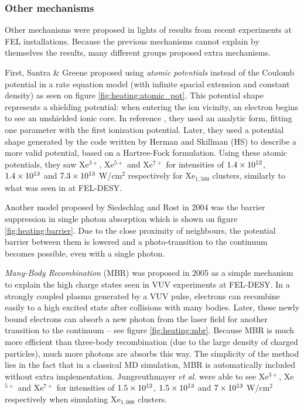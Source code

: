 \subsubsection{Other mechanisms}
Other mechanisms were proposed in lights of results from recent experiments at
FEL installations\cite{Wabnitz2002}. Because the previous mechanisms cannot
explain by themselves
the results, many different groups proposed extra mechanisms.


First, Santra \& Greene proposed using \textit{atomic potentials} instead of
the Coulomb potential in a rate equation model (with infinite spacial
extension and
constant density) as seen on figure \ref{fig:heating:atomic_pot}.
This potential shape represents a shielding potential: when
entering the ion vicinity, an electron begins to see an unshielded ionic core.
In reference \cite{Greene2003}, they used an analytic form, fitting one
parameter
with the first ionization potential. Later\cite{Walters2006}, they used a
potential shape generated by the code written by Herman and
Skillman\cite{HS1963} (HS) to describe a more valid potential, based on a
Hartree-Fock formulation. Using these atomic potentials, they saw Xe$^{3+}$,
Xe$^{5+}$ and Xe$^{7+}$ for intensities of $\ten{1.4}{12}$, $\ten{1.4}{13}$ and
$\ten{7.3}{13}$ W/cm$^2$ respectively for Xe$_{1,500}$ clusters, similarly to
what was seen in at FEL-DESY.

Another model proposed by Siedschlag and Rost\cite{Siedschlag2004} in 2004 was
the barrier suppression in single photon absorption which is shown on figure
\ref{fig:heating:barrier}. Due to the close proximity
of neighbours, the potential barrier between them is lowered and
a photo-transition to the continuum becomes possible, even with a single photon.

\textit{Many-Body Recombination} (MBR) was proposed in 2005
as a simple mechanism to explain the high charge states seen in VUV
experiments at FEL-DESY\cite{Jungreuthmayer2005}. In a strongly coupled plasma
generated by a VUV pulse, electrons can recombine easily to a high excited
state after collisions with many bodies. Later, these newly bound electrons can
absorb a new photon from the laser field for another transition to the
continuum -- see figure \ref{fig:heating:mbr}.
Because MBR is much more efficient than three-body
recombination (due to the large density of charged particles), much more
photons are absorbs this way. The simplicity of the
method lies in the fact that in a classical MD simulation, MBR is automatically
included without extra implementation. Jungreuthmayer \textit{et al.} were able
to see Xe$^{3+}$, Xe$^{5+}$ and Xe$^{7+}$ for intensities of $\ten{1.5}{12}$,
$\ten{1.5}{13}$ and $\ten{7}{13}$ W/cm$^2$ respectively when simulating
Xe$_{1,000}$ clusters.



